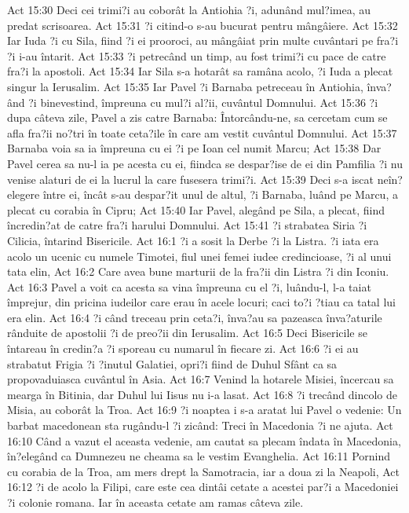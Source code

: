 Act 15:30  Deci cei trimi?i au coborât la Antiohia ?i, adunând mul?imea, au predat scrisoarea.
Act 15:31  ?i citind-o s-au bucurat pentru mângâiere.
Act 15:32  Iar Iuda ?i cu Sila, fiind ?i ei prooroci, au mângâiat prin multe cuvântari pe fra?i ?i i-au întarit.
Act 15:33  ?i petrecând un timp, au fost trimi?i cu pace de catre fra?i la apostoli.
Act 15:34  Iar Sila s-a hotarât sa ramâna acolo, ?i Iuda a plecat singur la Ierusalim.
Act 15:35  Iar Pavel ?i Barnaba petreceau în Antiohia, înva?ând ?i binevestind, împreuna cu mul?i al?ii, cuvântul Domnului.
Act 15:36  ?i dupa câteva zile, Pavel a zis catre Barnaba: Întorcându-ne, sa cercetam cum se afla fra?ii no?tri în toate ceta?ile în care am vestit cuvântul Domnului.
Act 15:37  Barnaba voia sa ia împreuna cu ei ?i pe Ioan cel numit Marcu;
Act 15:38  Dar Pavel cerea sa nu-l ia pe acesta cu ei, fiindca se despar?ise de ei din Pamfilia ?i nu venise alaturi de ei la lucrul la care fusesera trimi?i.
Act 15:39  Deci s-a iscat neîn?elegere între ei, încât s-au despar?it unul de altul, ?i Barnaba, luând pe Marcu, a plecat cu corabia în Cipru;
Act 15:40  Iar Pavel, alegând pe Sila, a plecat, fiind încredin?at de catre fra?i harului Domnului.
Act 15:41  ?i strabatea Siria ?i Cilicia, întarind Bisericile.
Act 16:1  ?i a sosit la Derbe ?i la Listra. ?i iata era acolo un ucenic cu numele Timotei, fiul unei femei iudee credincioase, ?i al unui tata elin,
Act 16:2  Care avea bune marturii de la fra?ii din Listra ?i din Iconiu.
Act 16:3  Pavel a voit ca acesta sa vina împreuna cu el ?i, luându-l, l-a taiat împrejur, din pricina iudeilor care erau în acele locuri; caci to?i ?tiau ca tatal lui era elin.
Act 16:4  ?i când treceau prin ceta?i, înva?au sa pazeasca înva?aturile rânduite de apostolii ?i de preo?ii din Ierusalim.
Act 16:5  Deci Bisericile se întareau în credin?a ?i sporeau cu numarul în fiecare zi.
Act 16:6  ?i ei au strabatut Frigia ?i ?inutul Galatiei, opri?i fiind de Duhul Sfânt ca sa propovaduiasca cuvântul în Asia.
Act 16:7  Venind la hotarele Misiei, încercau sa mearga în Bitinia, dar Duhul lui Iisus nu i-a lasat.
Act 16:8  ?i trecând dincolo de Misia, au coborât la Troa.
Act 16:9  ?i noaptea i s-a aratat lui Pavel o vedenie: Un barbat macedonean sta rugându-l ?i zicând: Treci în Macedonia ?i ne ajuta.
Act 16:10  Când a vazut el aceasta vedenie, am cautat sa plecam îndata în Macedonia, în?elegând ca Dumnezeu ne cheama sa le vestim Evanghelia.
Act 16:11  Pornind cu corabia de la Troa, am mers drept la Samotracia, iar a doua zi la Neapoli,
Act 16:12  ?i de acolo la Filipi, care este cea dintâi cetate a acestei par?i a Macedoniei ?i colonie romana. Iar în aceasta cetate am ramas câteva zile.
